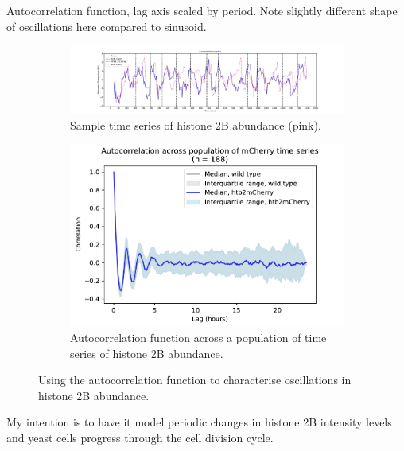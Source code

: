 Autocorrelation function, lag axis scaled by period.
Note slightly different shape of oscillations here compared to sinusoid.

\begin{figure}
  \centering
  \begin{subfigure}[t]{0.9\textwidth}
  \centering
    \includegraphics[width=\linewidth]{htb2mCherry_26643_plots_purple_01.pdf}
    \caption{
      Sample time series of histone 2B abundance (pink).
    }
    \label{fig:acf-sinusoid-biol-ts}
  \end{subfigure}

  \begin{subfigure}[t]{0.7\textwidth}
  \centering
    \includegraphics[width=\linewidth]{htb2mCherry_26643_plots_mCh_06.png}
    \caption{
      Autocorrelation function across a population of time series of histone 2B abundance.
    }
    \label{fig:acf-sinusoid-biol-acf}
  \end{subfigure}

  \caption{
    Using the autocorrelation function to characterise oscillations in histone 2B abundance.
  }
  \label{fig:acf-sinusoid-biol}
\end{figure}

My intention is to have it model periodic changes in histone 2B intensity levels and yeast cells progress through the cell division cycle.

